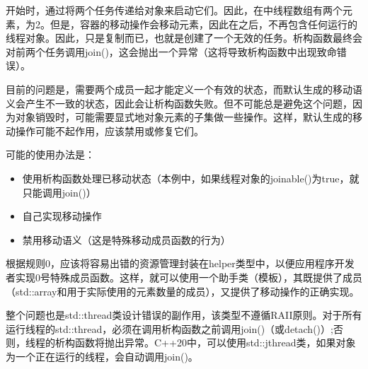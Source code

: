 开始时，通过将两个任务传递给对象来启动它们。因此，在中线程数组有两个元素，为2。但是，容器的移动操作会移动元素，因此在之后，不再包含任何运行的线程对象。因此，只是复制而已，也就是创建了一个无效的任务。析构函数最终会对前两个任务调用join()，这会抛出一个异常（这将导致析构函数中出现致命错误）。

目前的问题是，需要两个成员一起才能定义一个有效的状态，而默认生成的移动语义会产生不一致的状态，因此会让析构函数失败。但不可能总是避免这个问题，因为对象销毁时，可能需要显式地对象元素的子集做一些操作。这样，默认生成的移动操作可能不起作用，应该禁用或修复它们。

可能的使用办法是：

\begin{itemize}
	\item 使用析构函数处理已移动状态（本例中，如果线程对象的joinable()为true，就只能调用join()）
	\item 自己实现移动操作
	\item 禁用移动语义（这是特殊移动成员函数的行为）
\end{itemize}

根据规则0，应该将容易出错的资源管理封装在helper类型中，以便应用程序开发者实现0号特殊成员函数。这样，就可以使用一个助手类（模板），其既提供了成员（std::array和用于实际使用的元素数量的成员），又提供了移动操作的正确实现。

整个问题也是std::thread类设计错误的副作用，该类型不遵循RAII原则。对于所有运行线程的std::thread，必须在调用析构函数之前调用join()（或detach()）;否则，线程的析构函数将抛出异常。C++20中，可以使用std::jthread类，如果对象为一个正在运行的线程，会自动调用join()。





















